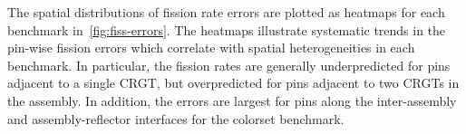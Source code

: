 The spatial distributions of fission rate errors are plotted as heatmaps for each benchmark in~\autoref{fig:fiss-errors}. The heatmaps illustrate systematic trends in the pin-wise fission errors which correlate with spatial heterogeneities in each benchmark. In particular, the fission rates are generally underpredicted for pins adjacent to a single CRGT, but overpredicted for pins adjacent to two CRGTs in the assembly. In addition, the errors are largest for pins along the inter-assembly and assembly-reflector interfaces for the colorset benchmark.


